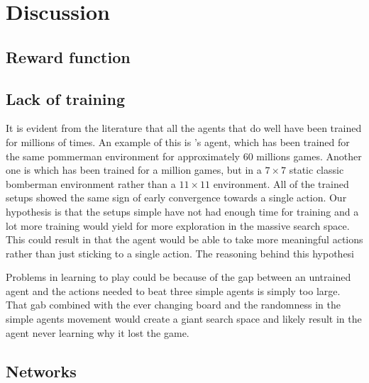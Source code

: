 \section{Discussion}
\label{sec:discussion}

\subsection{Reward function}

\subsection{Lack of training}
It is evident from the literature that all the agents that do well have been trained for millions of times. An example of this is \cite{rwightman}'s agent, which has been trained for the same pommerman environment for approximately 60 millions games. Another one is \cite{kormelink2018exploration} which has been trained for a million games, but in a $7 \times 7$ static classic bomberman environment rather than a $11 \times 11$ environment. All of the trained setups showed the same sign of early convergence towards a single action. Our hypothesis is that the setups simple have not had enough time for training and a lot more training would yield for more exploration in the massive search space. This could result in that the agent would be able to take more meaningful actions rather than just sticking to a single action. The reasoning behind this hypothesi



Problems in learning to play could be because of the gap between an untrained agent and the actions needed to beat three simple agents is simply too large. That gab combined with the ever changing board and the randomness in the simple agents movement would create a giant search space and likely result in the agent never learning why it lost the game.


\subsection{Networks}